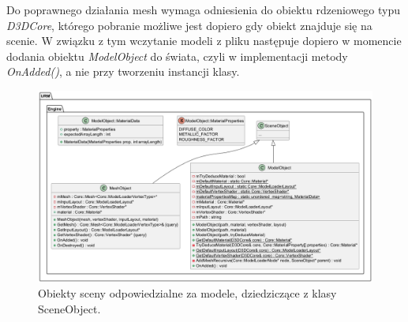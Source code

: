 	Do poprawnego działania mesh wymaga odniesienia do obiektu rdzeniowego typu \textit{D3DCore}, którego pobranie możliwe jest dopiero gdy obiekt znajduje się na scenie. W związku z tym wczytanie modeli z pliku następuje dopiero w momencie dodania obiektu \textit{ModelObject} do świata, czyli w implementacji metody \textit{OnAdded()}, a nie przy tworzeniu instancji klasy.
	
	\begin{figure}[h!]
		\centering
		\includegraphics[width=\textwidth]{images/UML/sceneobjects_model.png}
		\caption{Obiekty sceny odpowiedzialne za modele, dziedziczące z klasy SceneObject.}
		\label{UML_SceneObjects_Model}
	\end{figure}

